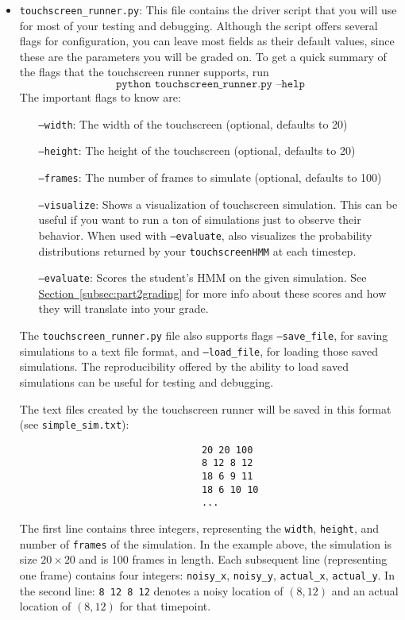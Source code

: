 \documentclass{article}
\begin{document}
\begin{itemize}
    \item \texttt{touchscreen\_runner.py}: This file contains the driver script that you will use for most of your testing and debugging. Although the script offers several flags for configuration, you can leave most fields as their default values, since these are the parameters you will be graded on. To get a quick summary of the flags that the touchscreen runner supports, run
        \[\texttt{python touchscreen\_runner.py --help}\]
        The important flags to know are:
        \begin{itemize}[label=, leftmargin=8em, nosep]
            \item[\texttt{--width}:] The width of the touchscreen (optional, defaults to 20)
            \item[\texttt{--height}:] The height of the touchscreen (optional, defaults to 20)
            \item[\texttt{--frames}:] The number of frames to simulate (optional, defaults to 100)
            \item[\texttt{--visualize}:] Shows a visualization of touchscreen simulation. This can be useful if you want to run a ton of simulations just to observe their behavior. When used with \texttt{--evaluate}, also visualizes the probability distributions returned by your \texttt{touchscreenHMM} at each timestep.
        \item[\texttt{--evaluate}:] Scores the student's HMM on the given simulation. See \hyperref[subsec:part2grading]{Section~\ref{subsec:part2grading}} for more info about these scores and how they will translate into your grade.
        \end{itemize}

        The \texttt{touchscreen\_runner.py} file also supports flags \texttt{--save\_file}, for saving simulations to a text file format, and \texttt{--load\_file}, for loading those saved simulations. The reproducibility offered by the ability to load saved simulations can be useful for testing and debugging.

        The text files created by the touchscreen runner will be saved in this format (see \texttt{simple\_sim.txt}):
        \begin{verbatim}
                                20 20 100
                                8 12 8 12
                                18 6 9 11
                                18 6 10 10
                                ...
        \end{verbatim}
        The first line contains three integers, representing the \texttt{width}, \texttt{height}, and number of \texttt{frames} of the simulation. In the example above, the simulation is size $20 \times 20$ and is 100 frames in length. Each subsequent line (representing one frame) contains four integers: \texttt{noisy\_x}, \texttt{noisy\_y}, \texttt{actual\_x}, \texttt{actual\_y}. In the second line: \texttt{8 12 8 12} denotes a noisy location of $(8, 12)$ and an actual location of $(8, 12)$ for that timepoint.


\end{itemize}
\end{document}
